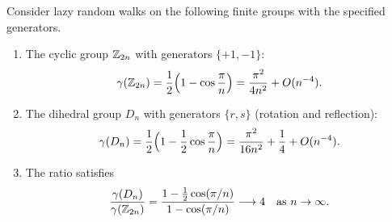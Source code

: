 \begin{theorem}\label{thm:spectral_gap}
Consider lazy random walks on the following finite groups with the
specified generators.
\begin{enumerate}[label=\textup{(\alph*)}]
\item\label{item:cyclic}
  The cyclic group $\mathbb{Z}_{2n}$ with generators $\{+1, -1\}$:
  \begin{equation}\label{eq:gap_cyclic}
    \gamma(\mathbb{Z}_{2n})
    = \frac{1}{2}\Bigl(1 - \cos\frac{\pi}{n}\Bigr)
    = \frac{\pi^2}{4n^2} + O(n^{-4}).
  \end{equation}

\item\label{item:dihedral}
  The dihedral group $D_n$ with generators $\{r, s\}$ (rotation and
  reflection):
  \begin{equation}\label{eq:gap_dihedral}
    \gamma(D_n)
    = \frac{1}{2}\Bigl(1 - \frac{1}{2}\cos\frac{\pi}{n}\Bigr)
    = \frac{\pi^2}{16n^2} + \frac{1}{4} + O(n^{-4}).
  \end{equation}

\item\label{item:ratio}
  The ratio satisfies
  \begin{equation}\label{eq:gap_ratio}
    \frac{\gamma(D_n)}{\gamma(\mathbb{Z}_{2n})}
    = \frac{1 - \frac{1}{2}\cos(\pi/n)}{1 - \cos(\pi/n)}
    \longrightarrow 4 \quad \text{as } n \to \infty.
  \end{equation}
\end{enumerate}
\end{theorem}

